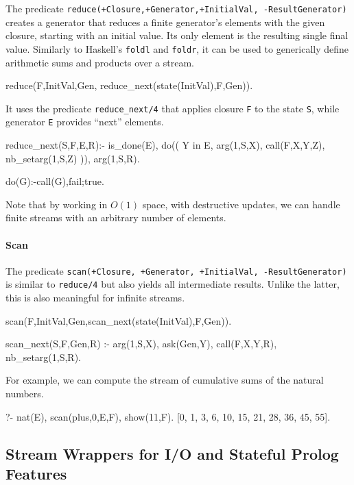 \documentclass[submission,copyright,creativecommons]{eptcs}
\begin{document}
The predicate {\tt reduce(+Closure,+Generator,+InitialVal, -ResultGenerator)}
creates a generator that reduces a finite generator's elements with the given closure, 
starting with an initial value. Its only element is the resulting single final value.
Similarly to Haskell's {\tt foldl} and {\tt foldr}, it can be used to
generically define arithmetic sums and products over a stream.

\begin{code}
reduce(F,InitVal,Gen, reduce_next(state(InitVal),F,Gen)).
\end{code}
It uses the predicate {\tt reduce\_next/4} 
that  applies closure {\tt F} to the state {\tt S}, 
while generator {\tt E} provides ``next'' elements.
\begin{code}
reduce_next(S,F,E,R):- \+ is_done(E),
  do((
    Y in E, arg(1,S,X),
    call(F,X,Y,Z),
    nb_setarg(1,S,Z)
  )),
  arg(1,S,R).

do(G):-call(G),fail;true.
\end{code}
Note that by working in $O(1)$ space, with destructive updates,
we can handle finite streams with an arbitrary number of elements.

\paragraph{Scan}

The predicate {\tt scan(+Closure, +Generator, +InitialVal, -ResultGenerator)} is
similar to \texttt{reduce/4} but also yields all intermediate results. Unlike the latter, this is
also meaningful for infinite streams.
\begin{code}
scan(F,InitVal,Gen,scan_next(state(InitVal),F,Gen)).

scan_next(S,F,Gen,R) :- arg(1,S,X),
  ask(Gen,Y),
  call(F,X,Y,R),
  nb_setarg(1,S,R).
\end{code}
For example, we can compute the stream of cumulative sums of the natural numbers.
\begin{codex}
?- nat(E), scan(plus,0,E,F), show(11,F).
[0, 1, 3, 6, 10, 15, 21, 28, 36, 45, 55].
\end{codex}

\subsection{Stream Wrappers for I/O and Stateful Prolog Features}
\end{document}
